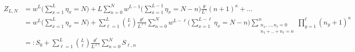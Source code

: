\documentclass[pdflatex,sn-mathphys-num]{sn-jnl}%
\theoremstyle{thmstyleone}%
\theoremstyle{thmstyletwo}%
\theoremstyle{thmstylethree}%
\begin{document}
\begin{align}
    Z_{L,N} 
		&= w^L \Big(\sum_{x=1}^L \eta_x =N\Big) +L\sum_{n=0}^N w^{L-1} \Big(\sum_{x=1}^{L-1} \eta_x =N-n\Big) \frac{\theta}{L^\gamma} (n+1)^\kappa +\ldots\nonumber\\
        &=w^L \Big(\sum_{x=1}^L \eta_x =N\Big) +\sum_{\ell =1}^L {L\choose\ell} \frac{\theta^\ell}{L^{\ell\gamma}} \sum_{n=0}^N w^{L-\ell} \Big(\sum_{x=1}^{L-\ell} \eta_x =N-n\Big)\sum_{\substack{n_1 ,\ldots ,n_\ell =0\\ n_1 +..+n_\ell =n}}^n \prod_{y=1}^\ell  (n_y +1)^\kappa \nonumber\\
        &=: S_0 +\sum_{\ell =1}^L {L\choose\ell} \frac{\theta^\ell}{L^{\ell\gamma}} \sum_{n=0}^N S_{\ell ,n}\label{toshow}
\end{align}
\end{document}
